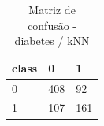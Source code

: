 \begin{table}[htbp]
\centering
\begin{tabular}{lll}
\hline
class & 0 & 1 \\
\hline
0 & 408 & 92 \\
1 & 107 & 161 \\
\hline
\end{tabular}
\caption{Matriz de confusão - diabetes / kNN}
\label{tab:ex3-diabetes-knn-cm}
\end{table}